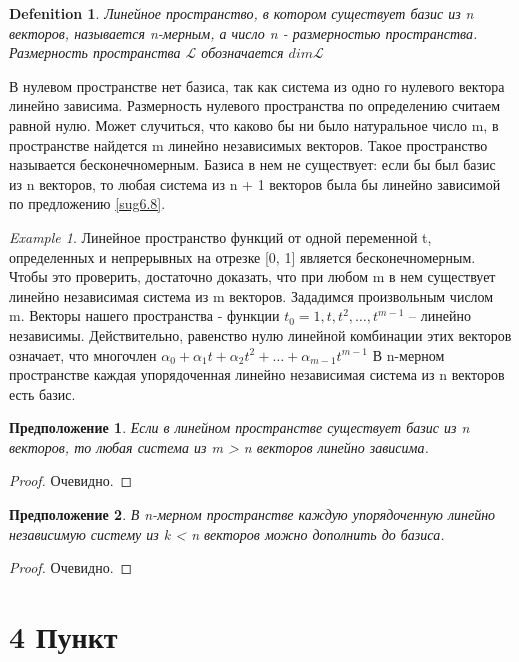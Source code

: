 \documentclass[11pt; a4paper]{report}
\theoremstyle{plain} %
\newtheorem{sug}{Предположение}[section]
\theoremstyle{defenition}
\newtheorem{glob_def}{Defenition}
\theoremstyle{remark}
\newtheorem*{exmpl}{Example}
\begin{document}
\begin{glob_def}
Линейное пространство, в котором существует базис из n векторов, называется n-мерным, а число n - размерностью пространства. Размерность пространства $\mathscr{L}$ обозначается $dim\mathscr{L}$
\end{glob_def}

В нулевом пространстве нет базиса, так как система из одно­ го нулевого вектора линейно зависима. 
Размерность нулевого прост­ранства по определению считаем равной нулю.
Может случиться, что каково бы ни было натуральное число m, в пространстве найдется m линейно
 независимых векторов. Такое пространство называется бесконечномерным. Базиса в нем не сущест­вует: 
 если бы был базис из n векторов, то любая система из n + 1 векторов была бы линейно зависимой по 
 предложению \ref{sug6.8}.
 \begin{exmpl}
 Линейное пространство функций от одной перемен­ной t, определенных и непрерывных на отрезке [0, 1] 
 является бес­конечномерным. Чтобы это проверить, достаточно доказать, что при любом m в нем существует 
 линейно независимая система из m век­торов. Зададимся произвольным числом m. Векторы нашего 
 прост­ранства - функции $t_0 = 1, t, t^2 ,\ldots, t^{m-1}$ -- линейно независимы. Действительно, 
 равенство нулю линейной комбинации этих векторов означает, что многочлен
$\alpha_0+ \alpha_1t+ \alpha_2t^2 +\ldots+\alpha_{m-1}t^{m-1}$
В n-мерном пространстве каждая упорядо­ченная линейно независимая система из n векторов есть базис.
\end{exmpl}

\begin{sug}\label{sug6.9}
Если в линейном пространстве существует базис из n векторов, то любая система из m > n векторов линейно
зависима.
\end{sug}
\begin{proof}
Очевидно.
\end{proof}

\begin{sug}\label{sug6.10}
В n-мерном пространстве каждую упорядоченную линейно независимую систему из k < n векторов можно 
до­полнить до базиса.
\end{sug}
\begin{proof}
Очевидно.
\end{proof}


\newpage
\section{4 Пункт}
\end{document}
